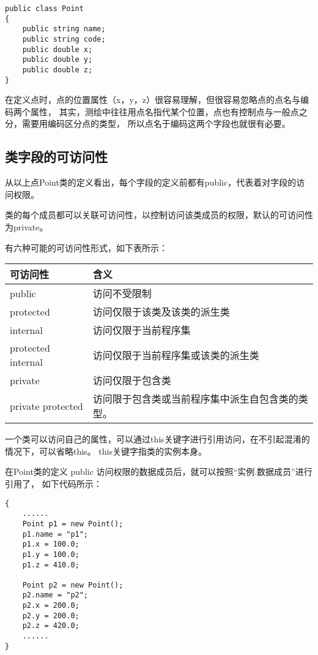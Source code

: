 \begin{lstlisting}
public class Point
{
    public string name;
    public string code;
    public double x;
    public double y;
    public double z;
}
\end{lstlisting}

在定义点时，点的位置属性（x，y，z）很容易理解，但很容易忽略点的点名与编码两个属性，
其实，测绘中往往用点名指代某个位置，点也有控制点与一般点之分，需要用编码区分点的类型，
所以点名于编码这两个字段也就很有必要。

\subsection{类字段的可访问性}

从以上点Point类的定义看出，每个字段的定义前都有public，代表着对字段的访问权限。

类的每个成员都可以关联可访问性，以控制访问该类成员的权限，默认的可访问性为private。

有六种可能的可访问性形式，如下表所示：

\begin{tabular}{|l|l|}
\hline
可访问性                 &   含义  \\
\hline
public                  &  访问不受限制   \\
protected               &  访问仅限于该类及该类的派生类  \\
internal                &  访问仅限于当前程序集  \\
protected internal      &  访问仅限于当前程序集或该类的派生类  \\
private                 &  访问仅限于包含类  \\
private protected       &  访问限于包含类或当前程序集中派生自包含类的类型。 \\
\hline
\end{tabular}

一个类可以访问自己的属性，可以通过this关键字进行引用访问，在不引起混淆的情况下，可以省略this。
this关键字指类的实例本身。

在Point类的定义 public 访问权限的数据成员后，就可以按照``实例.数据成员''进行引用了，
如下代码所示：

\begin{lstlisting}
{
    ......
    Point p1 = new Point();
    p1.name = "p1";
    p1.x = 100.0;
    p1.y = 100.0;
    p1.z = 410.0;

    Point p2 = new Point();
    p2.name = "p2";
    p2.x = 200.0;
    p2.y = 200.0;
    p2.z = 420.0;
    ......
}
\end{lstlisting}

